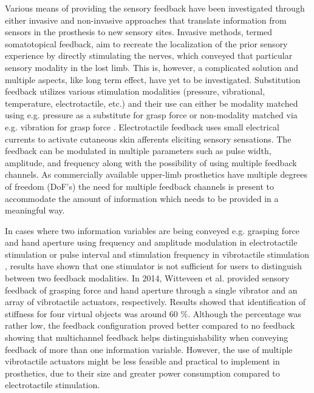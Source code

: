 %
Various means of providing the sensory feedback have been investigated through either invasive and non-invasive approaches that translate information from sensors in the prosthesis to new sensory sites. Invasive methods, termed somatotopical feedback, aim to recreate the localization of the prior sensory experience by directly stimulating the nerves, which conveyed that particular sensory modality in the lost limb. This is, however, a complicated solution and multiple aspects, like long term effect, have yet to be investigated. \cite{Schofield2014,Stephens-Fripp2018} 
Substitution feedback utilizes various stimulation modalities (pressure, vibrational, temperature, electrotactile, etc.) and their use can either be modality matched using e.g. pressure as a substitute for grasp force \cite{Godfrey2017} or non-modality matched via e.g. vibration for grasp force \cite{Ninu2014,Nabeel2016}. 
Electrotactile feedback uses small electrical currents to activate cutaneous skin afferents eliciting sensory sensations. The feedback can be modulated in multiple parameters such as pulse width, amplitude, and frequency along with the possibility of using multiple feedback channels. \cite{Geng2012} As commercially available upper-limb prosthetics have multiple degrees of freedom (DoF's) \cite{Cordella2016} the need for multiple feedback channels is present to accommodate the amount of information which needs to be provided in a meaningful way. 

%
In cases where two information variables are being conveyed e.g. grasping force and hand aperture using frequency and amplitude modulation in electrotactile stimulation \cite{Prior1976} or pulse interval and stimulation frequency in vibrotactile stimulation \cite{Chatterjee2008}, results have shown that one stimulator is not sufficient for users to distinguish between two feedback modalities. In 2014, Witteveen et al. \cite{Witteveen2014} provided sensory feedback of grasping force and hand aperture through a single vibrator and an array of vibrotactile actuators, respectively. Results showed that identification of stiffness for four virtual objects was around 60 $\%$. Although the percentage was rather low, the feedback configuration proved better compared to no feedback showing that multichannel feedback helps distinguishability when conveying feedback of more than one information variable. \cite{Witteveen2014} However, the use of multiple vibrotactile actuators might be less feasible and practical to implement in prosthetics, due to their size and greater power consumption compared to electrotactile stimulation.  

